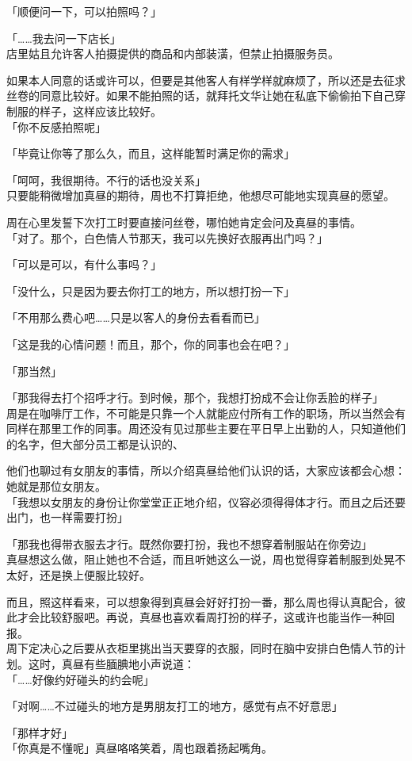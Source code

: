「顺便问一下，可以拍照吗？」

「……我去问一下店长」\\

店里姑且允许客人拍摄提供的商品和内部装潢，但禁止拍摄服务员。

如果本人同意的话或许可以，但要是其他客人有样学样就麻烦了，所以还是去征求丝卷的同意比较好。如果不能拍照的话，就拜托文华让她在私底下偷偷拍下自己穿制服的样子，这样应该比较好。\\

「你不反感拍照呢」

「毕竟让你等了那么久，而且，这样能暂时满足你的需求」

「呵呵，我很期待。不行的话也没关系」\\

只要能稍微增加真昼的期待，周也不打算拒绝，他想尽可能地实现真昼的愿望。

周在心里发誓下次打工时要直接问丝卷，哪怕她肯定会问及真昼的事情。\\

「对了。那个，白色情人节那天，我可以先换好衣服再出门吗？」

「可以是可以，有什么事吗？」

「没什么，只是因为要去你打工的地方，所以想打扮一下」

「不用那么费心吧……只是以客人的身份去看看而已」

「这是我的心情问题！而且，那个，你的同事也会在吧？」

「那当然」

「那我得去打个招呼才行。到时候，那个，我想打扮成不会让你丢脸的样子」\\

周是在咖啡厅工作，不可能是只靠一个人就能应付所有工作的职场，所以当然会有同样在那里工作的同事。周还没有见过那些主要在平日早上出勤的人，只知道他们的名字，但大部分员工都是认识的、

他们也聊过有女朋友的事情，所以介绍真昼给他们认识的话，大家应该都会心想：她就是那位女朋友。\\

「我想以女朋友的身份让你堂堂正正地介绍，仪容必须得得体才行。而且之后还要出门，也一样需要打扮」

「那我也得带衣服去才行。既然你要打扮，我也不想穿着制服站在你旁边」\\

真昼想这么做，阻止她也不合适，而且听她这么一说，周也觉得穿着制服到处晃不太好，还是换上便服比较好。

而且，照这样看来，可以想象得到真昼会好好打扮一番，那么周也得认真配合，彼此才会比较舒服吧。再说，真昼也喜欢看周打扮的样子，这或许也能当作一种回报。\\

周下定决心之后要从衣柜里挑出当天要穿的衣服，同时在脑中安排白色情人节的计划。这时，真昼有些腼腆地小声说道：\\

「……好像约好碰头的约会呢」

「对啊……不过碰头的地方是男朋友打工的地方，感觉有点不好意思」


「那样才好」\\

「你真是不懂呢」真昼咯咯笑着，周也跟着扬起嘴角。
